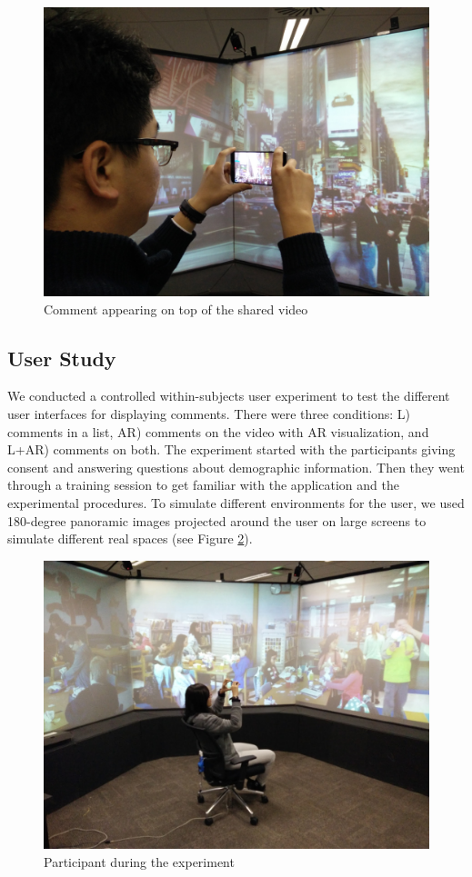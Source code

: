 \begin{figure}[ht]
  \centering
  \includegraphics[width=.8\linewidth]{images/mgia16/participant2}
  \caption{Comment appearing on top of the shared video}
	\label{comments}
\end{figure}


\subsection{User Study}

We conducted a controlled within-subjects user experiment to test the different user interfaces for displaying comments. There were three conditions: L) comments in a list, AR) comments on the video with AR visualization, and L+AR) comments on both. The experiment started with the participants giving consent and answering questions about demographic information. Then they went through a training session to get familiar with the application and the experimental procedures. To simulate different environments for the user, we used 180-degree panoramic images projected around the user on large screens to simulate different real spaces (see Figure \ref{fig:mgia16:participant}).

\begin{figure}[ht]
  \centering
  \includegraphics[width=.6\linewidth]{images/mgia16/participant1}
  \caption{Participant during the experiment}
	\label{fig:mgia16:participant}
\end{figure}

